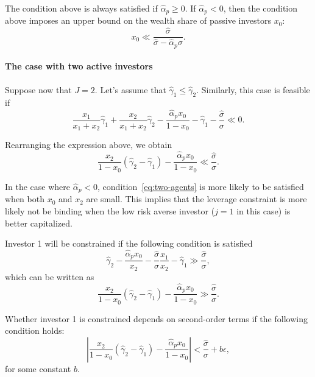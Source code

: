 The condition above is always satisfied if $\hat{\alpha}_p \geq 0$. If $\hat{\alpha}_p < 0$, then the condition above imposes an upper bound on the wealth share of passive investors $x_0$:
\begin{equation}
     x_0 \ll \frac{\hat{\sigma}}{\hat{\sigma} - \hat{\alpha}_p \sigma}. 
\end{equation}

\paragraph{The case with two active investors} Suppose now that $J = 2$. Let's assume that $\hat{\gamma}_1\leq \hat{\gamma}_2$. Similarly, this case is feasible if 
\begin{equation}
    \frac{x_1}{x_1+x_2} \hat{\gamma}_1 + \frac{x_2}{x_1+x_2} \hat{\gamma}_2  - \frac{\hat{\alpha}_p x_0}{1-x_0} - \hat{\gamma}_1 - \frac{\hat{\sigma}}{\sigma} \ll 0.
\end{equation}

Rearranging the expression above, we obtain
\begin{equation}\label{eq:two-agents}
    \frac{x_2}{1-x_0} (\hat{\gamma}_2-\hat{\gamma}_1) - \frac{\hat{\alpha}_p x_0}{1-x_0}  \ll \frac{\hat{\sigma}}{\sigma}.
\end{equation}

In the case where $\hat{\alpha}_p < 0$, condition~\eqref{eq:two-agents} is more likely to be satisfied when both $x_0$ and $x_2 $ are small. This implies that the leverage constraint is more likely not be binding when the low risk averse investor ($ j=1 $ in this case) is better capitalized.

Investor 1 will be constrained if the following condition is satisfied
\begin{equation}
    \hat{\gamma}_2 - \frac{\hat{\alpha}_p x_0}{x_2} - \frac{\hat{\sigma}}{\sigma} \frac{x_1}{x_2} - \hat{\gamma}_1  \gg \frac{\hat{\sigma}}{\sigma},
\end{equation}
which can be written as
\begin{equation}
    \frac{x_2}{1-x_0} (\hat{\gamma}_2 - \hat{\gamma}_1)- \frac{\hat{\alpha}_p x_0}{1-x_0} \gg \frac{\hat{\sigma}}{\sigma}.
\end{equation}

Whether investor 1 is constrained depends on second-order terms if the following condition holds:
\begin{equation}
    \left|\frac{x_2}{1-x_0} (\hat{\gamma}_2-\hat{\gamma}_1) - \frac{\hat{\alpha}_p x_0}{1-x_0}\right| < \frac{\hat{\sigma}}{\sigma} + b \epsilon,
\end{equation}
for some constant $b$. 


